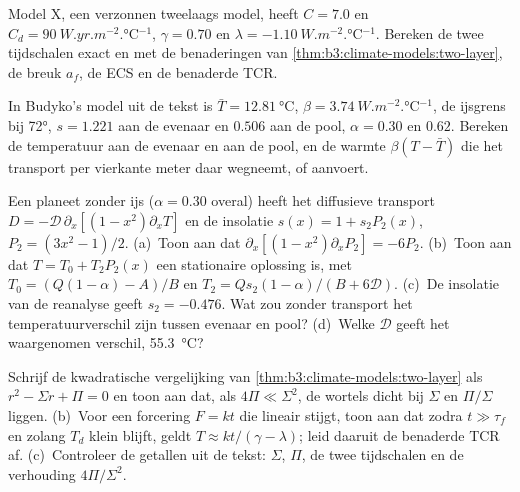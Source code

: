\begin{exercise}[$\star\star$]\label{exo:b3:climate-models:8}
Model X, een verzonnen tweelaags model, heeft $C = 7.0$ en $C_d =
\qty{90}{W.yr.m^{-2}.\celsius^{-1}}$, $\gamma = 0.70$ en $\lambda =
\qty{-1.10}{W.m^{-2}.\celsius^{-1}}$. Bereken de twee tijdschalen exact
en met de benaderingen van \cref{thm:b3:climate-models:two-layer}, de
breuk $a_f$, de ECS en de benaderde TCR.
\end{exercise}

\begin{exercise}[$\star\star$]\label{exo:b3:climate-models:9}
In Budyko's model uit de tekst is $\bar T = \qty{12.81}{\celsius}$, $\beta =
\qty{3.74}{W.m^{-2}.\celsius^{-1}}$, de ijsgrens bij \ang{72}, $s = 1.221$
aan de evenaar en $0.506$ aan de pool, $\alpha = 0.30$ en $0.62$.
Bereken de temperatuur aan de evenaar en aan de pool, en de warmte
$\beta(T - \bar T)$ die het transport per
vierkante meter daar wegneemt, of aanvoert.
\end{exercise}

\begin{exercise}[$\star\star\star$]\label{exo:b3:climate-models:10}
Een planeet zonder ijs ($\alpha = 0.30$ overal) heeft het diffusieve
transport $D = -\mathcal D\,\partial_x[(1 - x^2)\partial_xT]$ en de
insolatie $s(x) = 1 + s_2P_2(x)$, $P_2 = (3x^2 - 1)/2$. (a)~Toon aan dat
$\partial_x[(1 - x^2)\partial_xP_2] = -6P_2$. (b)~Toon aan dat $T = T_0 +
T_2P_2(x)$ een stationaire oplossing is, met $T_0 = (Q(1 - \alpha) - A)/B$ en
$T_2 = Qs_2(1 - \alpha)/(B + 6\mathcal D)$. (c)~De insolatie van de
reanalyse geeft $s_2 = \num{-0.476}$. Wat zou zonder transport het temperatuurverschil zijn tussen
evenaar en pool? (d)~Welke $\mathcal D$ geeft
het waargenomen verschil, \qty{55.3}{\celsius}?
\end{exercise}

\begin{exercise}[$\star\star\star$]\label{exo:b3:climate-models:11}
Schrijf de kwadratische vergelijking van \cref{thm:b3:climate-models:two-layer} als $r^2 -
\Sigma r + \Pi = 0$ en toon aan dat, als $4\Pi \ll \Sigma^2$, de wortels dicht bij
$\Sigma$ en $\Pi/\Sigma$ liggen. (b)~Voor een forcering $F = kt$ die lineair stijgt,
toon aan dat zodra $t \gg \tau_f$ en zolang $T_d$ klein blijft,
geldt $T \approx kt/(\gamma - \lambda)$; leid daaruit de benaderde TCR af. (c)~Controleer
de getallen uit de tekst: $\Sigma$, $\Pi$, de twee tijdschalen en de
verhouding $4\Pi/\Sigma^2$.
\end{exercise}

